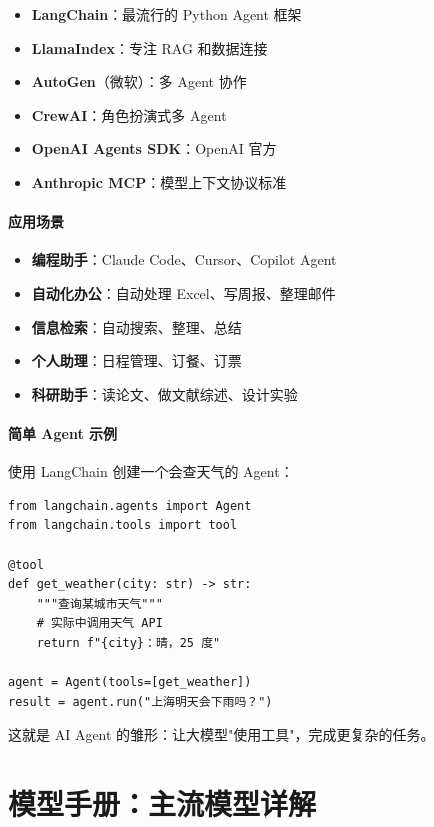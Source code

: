 \documentclass[12pt,UTF8]{ctexbook}
\begin{document}
\begin{itemize}
  \item \textbf{LangChain}：最流行的 Python Agent 框架
  \item \textbf{LlamaIndex}：专注 RAG 和数据连接
  \item \textbf{AutoGen}（微软）：多 Agent 协作
  \item \textbf{CrewAI}：角色扮演式多 Agent
  \item \textbf{OpenAI Agents SDK}：OpenAI 官方
  \item \textbf{Anthropic MCP}：模型上下文协议标准
\end{itemize}

\subsection{应用场景}

\begin{itemize}
  \item \textbf{编程助手}：Claude Code、Cursor、Copilot Agent
  \item \textbf{自动化办公}：自动处理 Excel、写周报、整理邮件
  \item \textbf{信息检索}：自动搜索、整理、总结
  \item \textbf{个人助理}：日程管理、订餐、订票
  \item \textbf{科研助手}：读论文、做文献综述、设计实验
\end{itemize}

\subsection{简单 Agent 示例}

使用 LangChain 创建一个会查天气的 Agent：

\begin{verbatim}
from langchain.agents import Agent
from langchain.tools import tool

@tool
def get_weather(city: str) -> str:
    """查询某城市天气"""
    # 实际中调用天气 API
    return f"{city}：晴，25 度"

agent = Agent(tools=[get_weather])
result = agent.run("上海明天会下雨吗？")
\end{verbatim}

这就是 AI Agent 的雏形：让大模型"使用工具"，完成更复杂的任务。


\part{模型手册：主流模型详解}
\end{document}
